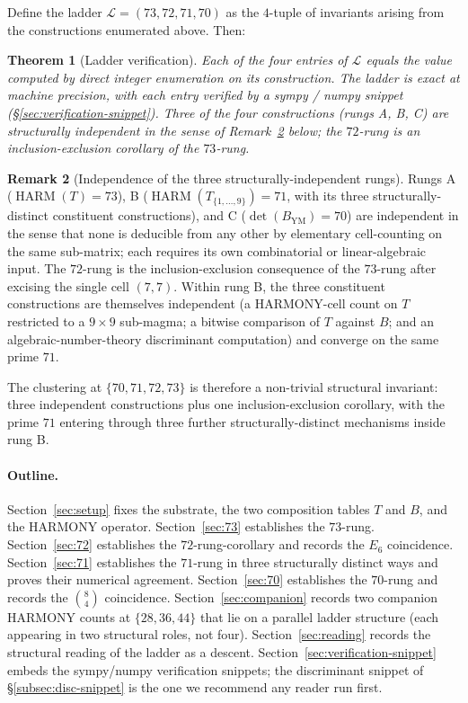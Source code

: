 \documentclass[11pt,reqno]{amsart}
\newtheorem{theorem}{Theorem}[section]
\theoremstyle{definition}
\newtheorem{remark}[theorem]{Remark}
\DeclareMathOperator{\HARM}{HARM}
\begin{document}
Define the ladder $\mathcal{L} = (73, 72, 71, 70)$ as the
$4$-tuple of invariants arising from the constructions enumerated
above. Then:

\begin{theorem}[Ladder verification]
\label{thm:ladder}
Each of the four entries of $\mathcal{L}$ equals the value computed
by direct integer enumeration on its construction. The ladder is
exact at machine precision, with each entry verified by a sympy /
numpy snippet (§\ref{sec:verification-snippet}). Three of the four
constructions (rungs A, B, C) are structurally independent in the
sense of Remark~\ref{rem:independence} below; the $72$-rung is an
inclusion-exclusion corollary of the $73$-rung.
\end{theorem}

\begin{remark}[Independence of the three structurally-independent
rungs]
\label{rem:independence}
Rungs A ($\HARM(T) = 73$), B ($\HARM(T_{\{1,\ldots,9\}}) = 71$, with
its three structurally-distinct constituent constructions), and C
($\det(B_{\mathrm{YM}}) = 70$) are independent in the sense that none
is deducible from any other by elementary cell-counting on the same
sub-matrix; each requires its own combinatorial or linear-algebraic
input. The $72$-rung is the inclusion-exclusion consequence of the
$73$-rung after excising the single cell $(7, 7)$. Within rung B,
the three constituent constructions are themselves independent (a
HARMONY-cell count on $T$ restricted to a $9 \times 9$ sub-magma; a
bitwise comparison of $T$ against $B$; and an algebraic-number-theory
discriminant computation) and converge on the same prime $71$.
\end{remark}

The clustering at $\{70, 71, 72, 73\}$ is therefore a non-trivial
structural invariant: three independent constructions plus one
inclusion-exclusion corollary, with the prime $71$ entering through
three further structurally-distinct mechanisms inside rung B.

\paragraph{Outline.}

Section~\ref{sec:setup} fixes the substrate, the two composition
tables $T$ and $B$, and the HARMONY operator. Section~\ref{sec:73}
establishes the $73$-rung. Section~\ref{sec:72} establishes the
$72$-rung-corollary and records the $E_6$ coincidence.
Section~\ref{sec:71} establishes the $71$-rung in three structurally
distinct ways and proves their numerical agreement.
Section~\ref{sec:70} establishes the $70$-rung and records the
$\binom{8}{4}$ coincidence. Section~\ref{sec:companion} records two
companion HARMONY counts at $\{28, 36, 44\}$ that lie on a parallel
ladder structure (each appearing in two structural roles, not four).
Section~\ref{sec:reading} records the structural reading of the
ladder as a descent. Section~\ref{sec:verification-snippet} embeds
the sympy/numpy verification snippets; the discriminant snippet of
§\ref{subsec:disc-snippet} is the one we recommend any reader run
first.
\end{document}
